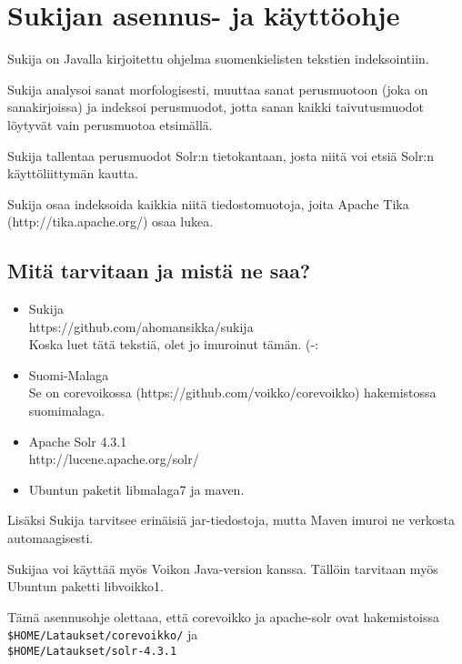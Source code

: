 \documentclass[12pt,a4paper]{scrartcl}
\begin{document}
\pagestyle{fancy}
\setlength{\parindent}{0pt}
\setlength{\parskip}{1ex plus 0.5ex minus 0.2ex}
\section*{Sukijan asennus- ja käyttöohje}

Sukija on Javalla kirjoitettu ohjelma suomenkielisten tekstien
indeksointiin.

Sukija analysoi sanat morfologisesti, muuttaa sanat perusmuotoon (joka
on sanakirjoissa) ja indeksoi perusmuodot, jotta sanan kaikki
taivutusmuodot löytyvät vain perusmuotoa etsimällä.

Sukija tallentaa perusmuodot Solr:n tietokantaan, josta niitä voi
etsiä Solr:n käyttöliittymän kautta.

Sukija osaa indeksoida kaikkia niitä tiedostomuotoja, joita Apache
Tika \\(http://tika.apache.org/) osaa lukea.

\subsection*{Mitä tarvitaan ja mistä ne saa?}

\begin{itemize}

\item Sukija \\
      https://github.com/ahomansikka/sukija \\
      Koska luet tätä tekstiä, olet jo imuroinut tämän. (-:

\item Suomi-Malaga \\
      Se on corevoikossa (https://github.com/voikko/corevoikko)
      hakemistossa \\
      suomimalaga.

\item Apache Solr 4.3.1 \\
      http://lucene.apache.org/solr/

\item Ubuntun paketit libmalaga7 ja maven.
\end{itemize}

Lisäksi Sukija tarvitsee erinäisiä jar-tiedostoja, mutta Maven imuroi
ne verkosta automaagisesti.

Sukijaa voi käyttää myös Voikon Java-version kanssa. Tällöin tarvitaan
myös Ubuntun paketti libvoikko1.

Tämä asennusohje olettaaa, että corevoikko ja apache-solr ovat hakemistoissa \\
\verb=$HOME/Lataukset/corevoikko/= ja \\
\verb=$HOME/Lataukset/solr-4.3.1=
\end{document}

